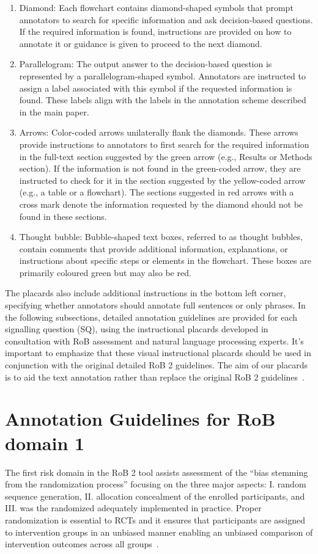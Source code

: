 \documentclass[sn-mathphys,Numbered]{sn-jnl}%
\begin{document}
\begin{enumerate}
    \item Diamond: Each flowchart contains diamond-shaped symbols that prompt annotators to search for specific information and ask decision-based questions. If the required information is found, instructions are provided on how to annotate it or guidance is given to proceed to the next diamond.
    \item Parallelogram: The output answer to the decision-based question is represented by a parallelogram-shaped symbol. Annotators are instructed to assign a label associated with this symbol if the requested information is found.
    These labels align with the labels in the annotation scheme described in the main paper.
    \item Arrows: Color-coded arrows unilaterally flank the diamonds. These arrows provide instructions to annotators to first search for the required information in the full-text section suggested by the green arrow (e.g., Results or Methods section). If the information is not found in the green-coded arrow, they are instructed to check for it in the section suggested by the yellow-coded arrow (e.g., a table or a flowchart). The sections suggested in red arrows with a cross mark denote the information requested by the diamond should not be found in these sections.
    \item Thought bubble: Bubble-shaped text boxes, referred to as thought bubbles, contain comments that provide additional information, explanations, or instructions about specific steps or elements in the flowchart. These boxes are primarily coloured green but may also be red.
\end{enumerate}
%
%
%
The placards also include additional instructions in the bottom left corner, specifying whether annotators should annotate full sentences or only phrases.
In the following subsections, detailed annotation guidelines are provided for each signalling question (SQ), using the instructional placards developed in consultation with RoB assessment and natural language processing experts.
It's important to emphasize that these visual instructional placards should be used in conjunction with the original detailed RoB 2 guidelines.
The aim of our placards is to aid the text annotation rather than replace the original RoB 2 guidelines~\cite{sterne2019rob}.
%
%
%
\section*{Annotation Guidelines for RoB domain 1}
\label{sec:dom1}
%
The first risk domain in the RoB 2 tool assists assessment of the ``bias stemming from the randomization process'' focusing on the three major aspects: I. random sequence generation, II. allocation concealment of the enrolled participants, and III. was the randomized adequately implemented in practice.
Proper randomization is essential to RCTs and it ensures that participants are assigned to intervention groups in an unbiased manner enabling an unbiased comparison of intervention outcomes across all groups~\cite{moher2010consort}.
%
%
%
\end{document}
